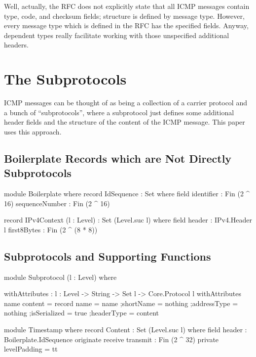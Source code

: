 \documentclass{report}
\begin{document}
\begin{itemize}
Well, actually, the RFC does not explicitly state that all ICMP messages contain type, code, and checksum fields; structure is defined by message type.  However, every message type which is defined in the RFC has the specified fields.  Anyway, dependent types really facilitate working with those unspecified additional headers.

\section{The Subprotocols}
ICMP messages can be thought of as being a collection of a carrier protocol and a bunch of ``subprotocols'', where a subprotocol just defines some additional header fields and the structure of the content of the ICMP message.  This paper uses this approach.

\subsection{Boilerplate Records which are Not Directly Subprotocols}

\begin{code}
  module Boilerplate where
    record IdSequence : Set where
      field
        identifier : Fin (2 ^ 16)
        sequenceNumber : Fin (2 ^ 16)

    record IPv4Context (l : Level) : Set (Level.suc l) where
      field
        header : IPv4.Header l
        first8Bytes : Fin (2 ^ (8 * 8))
\end{code}

\subsection{Subprotocols and Supporting Functions}

\begin{code}
  module Subprotocol (l : Level) where
\end{code}

\begin{code}
    withAttributes : {l : Level} -> String -> Set l -> Core.Protocol l
    withAttributes name content = record
      {name = name
      ;shortName = nothing
      ;addressType = nothing
      ;isSerialized = true
      ;headerType = content
      }
\end{code}

\begin{code}
    module Timestamp where
      record Content : Set (Level.suc l) where
        field
          header : Boilerplate.IdSequence
          originate
           receive
           transmit : Fin (2 ^ 32)
        private
          levelPadding = tt


\end{code}
\end{itemize}
\end{document}
